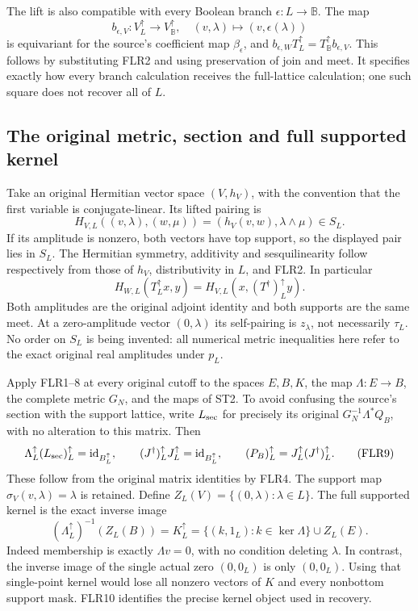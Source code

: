 \documentclass[11pt]{article}
\begin{document}
The lift is also compatible with every Boolean branch
$\epsilon:L\to\mathbb B$. The map
\[
b_{\epsilon,V}:V_L^\uparrow\longrightarrow V_{\mathbb B}^\uparrow,
\quad(v,\lambda)\longmapsto(v,\epsilon(\lambda))
\tag{FLR6}
\]
is equivariant for the source's coefficient map $\beta_\epsilon$,
and $b_{\epsilon,W}T_L^\uparrow=T_{\mathbb B}^\uparrow b_{\epsilon,V}$.
This follows by substituting FLR2 and using preservation of join and
meet. It specifies exactly how every branch calculation receives the
full-lattice calculation; one such square does not recover all of $L$.

\subsection{The original metric, section and full supported kernel}
Take an original Hermitian vector space $(V,h_V)$, with the convention
that the first variable is conjugate-linear. Its lifted pairing is
\[
H_{V,L}((v,\lambda),(w,\mu))
  =(h_V(v,w),\lambda\wedge\mu)\in S_L.
\tag{FLR7}
\]
If its amplitude is nonzero, both vectors have top support, so the
displayed pair lies in $S_L$. The Hermitian symmetry, additivity and
sesquilinearity follow respectively from those of $h_V$, distributivity
in $L$, and FLR2. In particular
\[
H_{W,L}(T_L^\uparrow x,y)
 =H_{V,L}(x,(T^\dagger)_L^\uparrow y).
\tag{FLR8}
\]
Both amplitudes are the original adjoint identity and both supports are
the same meet. At a zero-amplitude vector $(0,\lambda)$ its self-pairing
is $z_\lambda$, not necessarily $\tau_L$. No order on $S_L$ is being
invented: all numerical metric inequalities here refer to the exact
original real amplitudes under $p_L$.

Apply FLR1--8 at every original cutoff to the spaces $E,B,K$, the map
$\Lambda:E\to B$, the complete metric $G_N$, and the maps of ST2.
To avoid confusing the source's section with the support lattice,
write $L_{\rm sec}$ for precisely its original
$G_N^{-1}\Lambda^*Q_B$, with no alteration to this matrix. Then
\[
\Lambda_L^\uparrow (L_{\rm sec})_L^\uparrow
   =\mathrm{id}_{B_L^\uparrow},\qquad
(J^\dagger)_L^\uparrow J_L^\uparrow
   =\mathrm{id}_{B_L^\uparrow},\qquad
(P_B)_L^\uparrow=J_L^\uparrow(J^\dagger)_L^\uparrow.
\tag{FLR9}
\]
These follow from the original matrix identities by FLR4. The support
map $\sigma_V(v,\lambda)=\lambda$ is retained. Define
$Z_L(V)=\{(0,\lambda):\lambda\in L\}$. The full supported kernel is
the exact inverse image
\[
(\Lambda_L^\uparrow)^{-1}(Z_L(B))
 =K_L^\uparrow
 =\{(k,1_L):k\in\ker\Lambda\}\cup Z_L(E).
\tag{FLR10}
\]
Indeed membership is exactly $\Lambda v=0$, with no condition deleting
$\lambda$. In contrast, the inverse image of the single actual zero
$(0,0_L)$ is only $(0,0_L)$. Using that single-point kernel would lose
all nonzero vectors of $K$ and every nonbottom support mask. FLR10
identifies the precise kernel object used in recovery.
\end{document}
